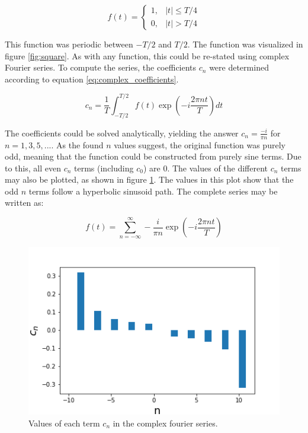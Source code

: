 \documentclass[twocolumn]{article}
\begin{document}
\[ 
f(t)=
\begin{cases}
1, & |t| \leq T/4 \label{eq:square}
\\
0, & |t| > T/4
\end{cases}
\]

This function was periodic between $-T/2$ and $T/2$. The function was visualized in figure \ref{fig:square}. As with any function, this could be re-stated using complex Fourier series. To compute the series, the coefficients $c_n$ were determined according to equation \ref{eq:complex_coefficients}. 

\begin{equation}
c_n = \frac{1}{T} \int_{-T/2}^{T/2} f(t) \exp(-i\frac{2\pi nt}{T}) dt
\label{eq:complex_coefficients}
\end{equation}

The coefficients could be solved analytically, yielding the answer $c_n = \frac{-i}{\pi n}$ for $n = 1, 3, 5, ...$. As the found $n$ values suggest, the original function was purely odd, meaning that the function could be constructed from purely sine terms. Due to this, all even $c_n$ terms (including $c_0$) are $0$. The values of the different $c_n$ terms may also be plotted, as shown in figure \ref{fig:Figure2}. The values in this plot show that the odd $n$ terms follow a hyperbolic sinusoid path. The complete series may be written as:

\[
f(t) = \sum_{n= -\infty}^{\infty} -\frac{i}{\pi n} \exp(-i \frac{2\pi nt}{T})
\]

\begin{figure}
\centering
\includegraphics[width=\linewidth]{Figure2}
\caption{Values of each term $c_n$ in the complex fourier series.}
\label{fig:Figure2}
\end{figure}
\end{document}
